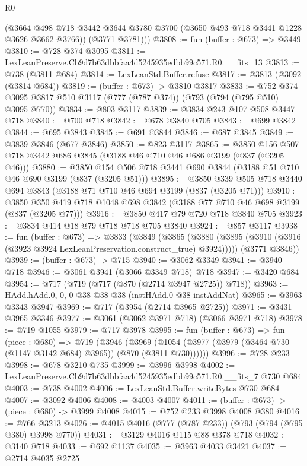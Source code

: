 \begin{lexlean}{R0}
\begin{coremodule}
        (@3664 @498 @718 @3442 @3644 @3780 @3700 (@3650 @493 @718 @3441 @1228 @3626 @3662 @3766))
        (@3771 @3781)))
@3808 := fun (buffer : @673) => @3449
@3810 := @728 @374 @3095
@3811 := LexLeanPreserve.Cb9d7b63dbbfaa4d5245935edbb99c571.R0.__fits_13
@3813 := @738 (@3811 @684)
@3814 := LexLeanStd.Buffer.refuse
@3817 := @3813 (@3092 (@3814 @684))
@3819 := (buffer : @673) -> @3810 @3817
@3833 := @752 @374 @3095 @3817 @510 @3117 (@777 (@787 @374)) (@793 (@794 (@795 @510) @3095 @770))
@3834 := @803 @3117
@3839 := @3834 @243 @107 @508 @3447 @718
@3840 := @700 @718
@3842 := @678 @3840 @705
@3843 := @699 @3842
@3844 := @695 @3843
@3845 := @691 @3844
@3846 := @687 @3845
@3849 := @3839 @3846 (@677 @3846)
@3850 := @823 @3117
@3865 := @3850 @156 @507 @718 @3442 @686 @3845 (@3188 @46 @710 @46 @686 @3199 (@837 (@3205 @46)))
@3880 := @3850 @154 @506 @718 @3441 @690 @3844 (@3188 @51 @710 @46 @690 @3199 (@837 (@3205 @51)))
@3895 := @3850 @339 @505 @718 @3440 @694 @3843 (@3188 @71 @710 @46 @694 @3199 (@837 (@3205 @71)))
@3910 := @3850 @350 @419 @718 @1048 @698 @3842 (@3188 @77 @710 @46 @698 @3199 (@837 (@3205 @77)))
@3916 := @3850 @417 @79 @720 @718 @3840 @705
@3923 := @3834 @414 @18 @79 @718 @718 @705 @3840
@3924 := @857 @3117
@3938 := fun (buffer : @673) =>
  @3833
    (@3849
      (@3865 (@3880 (@3895 (@3910 (@3916 (@3923 @3924 LexLeanPreservation.construct_true) @3924)))))
      (@3771 @3846))
@3939 := (buffer : @673) -> @715
@3940 := @3062 @3349
@3941 := @3940 @718
@3946 := @3061 @3941 (@3066 @3349 @718) @718
@3947 := @3420 @684
@3954 := @717 (@719 (@717 (@870 (@2714 @3947 @2725)) @718))
@3963 := HAdd.hAdd.{0, 0, 0} @38 @38 @38 (instHAdd.{0} @38 instAddNat)
@3965 := @3963 @3343 @3947
@3969 := @717 (@3954 (@2714 @3965 @2725))
@3971 := @3431 @3965 @3346
@3977 := @3061 (@3062 @3971 @718) (@3066 @3971 @718)
@3978 := @719 @1055
@3979 := @717 @3978
@3995 := fun (buffer : @673) =>
  fun (piece : @680) =>
  @719
    (@3946
      (@3969 (@1054 (@3977 (@3979 (@3464 @730 (@1147 @3142 @684) @3965)) (@870 (@3811 @730))))))
@3996 := @728 @233
@3998 := @678 @3210 @735
@3999 := @3996 @3998
@4002 := LexLeanPreserve.Cb9d7b63dbbfaa4d5245935edbb99c571.R0.__fits_7 @730 @684
@4003 := @738 @4002
@4006 := LexLeanStd.Buffer.writeBytes @730 @684
@4007 := @3092 @4006
@4008 := @4003 @4007
@4011 := (buffer : @673) -> (piece : @680) -> @3999 @4008
@4015 := @752 @233 @3998 @4008 @380
@4016 := @766 @3213
@4026 := @4015 @4016 (@777 (@787 @233)) (@793 (@794 (@795 @380) @3998 @770))
@4031 := @3129 @4016 @115 @88 @378 @718
@4032 := @3140 @718
@4033 := @692 @1137
@4035 := @3963 @4033 @3421
@4037 := @2714 @4035 @2725

\end{coremodule}
\end{lexlean}

